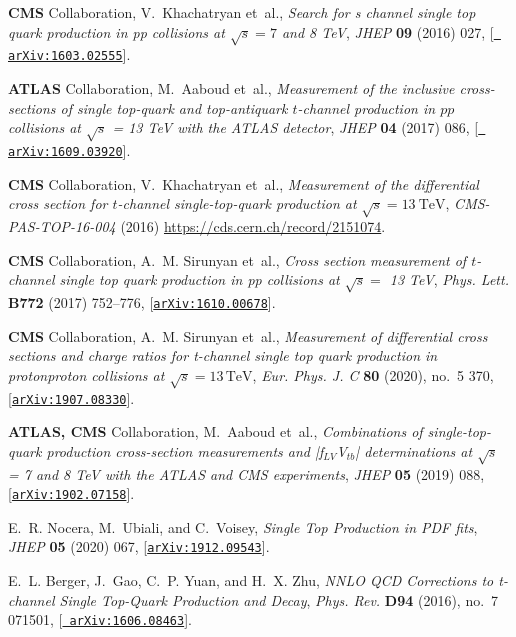 \documentclass[11pt,a4paper]{article}
\numberwithin{equation}{section}
\numberwithin{figure}{section}
\numberwithin{table}{section}
\begin{document}
\begin{thebibliography}{100}
{\bf CMS} Collaboration, V.~Khachatryan et~al., {\it {Search for s channel
  single top quark production in pp collisions at $ \sqrt{s}=7 $ and 8 TeV}},
  {\em JHEP} {\bf 09} (2016) 027, [\href{http://arxiv.org/abs/1603.02555}{{\tt
  arXiv:1603.02555}}].

{\bf ATLAS} Collaboration, M.~Aaboud et~al., {\it {Measurement of the inclusive
  cross-sections of single top-quark and top-antiquark $t$-channel production
  in $pp$ collisions at $\sqrt{s}$ = 13 TeV with the ATLAS detector}},  {\em
  JHEP} {\bf 04} (2017) 086, [\href{http://arxiv.org/abs/1609.03920}{{\tt
  arXiv:1609.03920}}].

{\bf CMS} Collaboration, V.~Khachatryan et~al., {\it {Measurement of the
  differential cross section for $t$-channel single-top-quark production at
  $\sqrt{s}=13~\mathrm{TeV}$}},  {\em CMS-PAS-TOP-16-004} (2016)
  \url{https://cds.cern.ch/record/2151074}.

{\bf CMS} Collaboration, A.~M. Sirunyan et~al., {\it {Cross section measurement
  of $t$-channel single top quark production in pp collisions at $\sqrt s =$ 13
  TeV}},  {\em Phys. Lett.} {\bf B772} (2017) 752--776,
  [\href{http://arxiv.org/abs/1610.00678}{{\tt arXiv:1610.00678}}].

{\bf CMS} Collaboration, A.~M. Sirunyan et~al., {\it {Measurement of
  differential cross sections and charge ratios for t-channel single top quark
  production in proton\textendash{}proton collisions at $\sqrt{s}=13\,\text
  {Te}\text {V}$}},  {\em Eur. Phys. J. C} {\bf 80} (2020), no.~5 370,
  [\href{http://arxiv.org/abs/1907.08330}{{\tt arXiv:1907.08330}}].

{\bf ATLAS, CMS} Collaboration, M.~Aaboud et~al., {\it {Combinations of
  single-top-quark production cross-section measurements and |f$_{LV}$V$_{tb}$|
  determinations at $ \sqrt{s} $ = 7 and 8 TeV with the ATLAS and CMS
  experiments}},  {\em JHEP} {\bf 05} (2019) 088,
  [\href{http://arxiv.org/abs/1902.07158}{{\tt arXiv:1902.07158}}].

E.~R. Nocera, M.~Ubiali, and C.~Voisey, {\it {Single Top Production in PDF
  fits}},  {\em JHEP} {\bf 05} (2020) 067,
  [\href{http://arxiv.org/abs/1912.09543}{{\tt arXiv:1912.09543}}].

E.~L. Berger, J.~Gao, C.~P. Yuan, and H.~X. Zhu, {\it {NNLO QCD Corrections to
  t-channel Single Top-Quark Production and Decay}},  {\em Phys. Rev.} {\bf
  D94} (2016), no.~7 071501, [\href{http://arxiv.org/abs/1606.08463}{{\tt
  arXiv:1606.08463}}].


\end{thebibliography}
\end{document}

